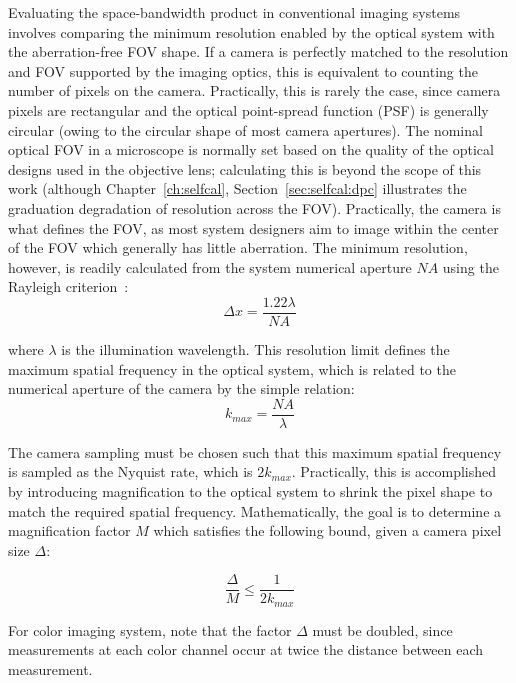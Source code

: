 Evaluating the space-bandwidth product in conventional imaging systems involves comparing the minimum resolution enabled by the optical system with the aberration-free FOV shape. If a camera is perfectly matched to the resolution and FOV supported by the imaging optics, this is equivalent to counting the number of pixels on the camera. Practically, this is rarely the case, since camera pixels are rectangular and the optical point-spread function (PSF) is generally circular (owing to the circular shape of most camera apertures). The nominal optical FOV in a microscope is normally set based on the quality of the optical designs used in the objective lens; calculating this is beyond the scope of this work (although Chapter~\ref{ch:selfcal}, Section~\ref{sec:selfcal:dpc} illustrates the graduation degradation of resolution across the FOV). Practically, the camera is what defines the FOV, as most system designers aim to image within the center of the FOV which generally has little aberration. The minimum resolution, however, is readily calculated from the system numerical aperture $NA$ using the Rayleigh criterion~\cite{rayleigh1896xv}:
\begin{equation}\label{eq:highthtoughput_rayleigh}
    \Delta x = \frac{1.22 \lambda}{NA}
\end{equation}

\noindent where $\lambda$ is the illumination wavelength. This resolution limit defines the maximum spatial frequency in the optical system, which is related to the numerical aperture of the camera by the simple relation:
\begin{equation}
    k_{max} = \frac{NA}{\lambda}
\end{equation}

The camera sampling must be chosen such that this maximum spatial frequency is sampled as the Nyquist rate, which is $2k_{max}$. Practically, this is accomplished by introducing magnification to the optical system to shrink the pixel shape to match the required spatial frequency. Mathematically, the goal is to determine a magnification factor $M$ which satisfies the following bound, given a camera pixel size $\Delta$:

\begin{equation}
    \frac{\Delta}{M} \leq \frac{1}{2k_{max}}
\end{equation}

For color imaging system, note that the factor $\Delta$ must be doubled, since measurements at each color channel occur at twice the distance between each measurement.

